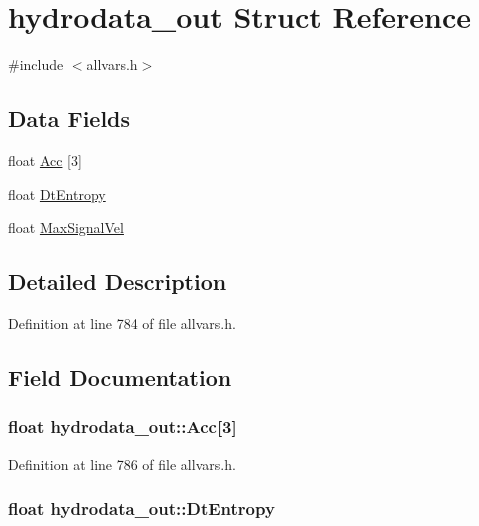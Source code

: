 \hypertarget{structhydrodata__out}{
\section{hydrodata\_\-out Struct Reference}
\label{structhydrodata__out}
}


{\ttfamily \#include $<$allvars.h$>$}

\subsection*{Data Fields}
\begin{DoxyCompactItemize}
\item 
float \hyperlink{structhydrodata__out_a7b3945aaa01f12e5af8be7731b362661}{Acc} \mbox{[}3\mbox{]}
\item 
float \hyperlink{structhydrodata__out_a0bd5bd8b7c1ec82abf3e5f001543441c}{DtEntropy}
\item 
float \hyperlink{structhydrodata__out_a6f4c65630e80c636a128d59e0afc4dad}{MaxSignalVel}
\end{DoxyCompactItemize}


\subsection{Detailed Description}


Definition at line 784 of file allvars.h.



\subsection{Field Documentation}
\hypertarget{structhydrodata__out_a7b3945aaa01f12e5af8be7731b362661}{
\subsubsection[{Acc}]{\setlength{\rightskip}{0pt plus 5cm}float {\bf hydrodata\_\-out::Acc}\mbox{[}3\mbox{]}}}
\label{structhydrodata__out_a7b3945aaa01f12e5af8be7731b362661}


Definition at line 786 of file allvars.h.

\hypertarget{structhydrodata__out_a0bd5bd8b7c1ec82abf3e5f001543441c}{
\subsubsection[{DtEntropy}]{\setlength{\rightskip}{0pt plus 5cm}float {\bf hydrodata\_\-out::DtEntropy}}}
\label{structhydrodata__out_a0bd5bd8b7c1ec82abf3e5f001543441c}


